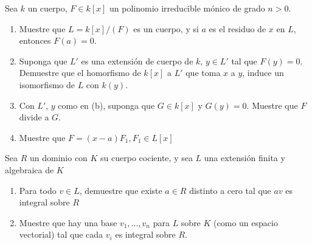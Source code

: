 \begin{prob}{1.51}
    Sea \(k\) un cuerpo, \(F\in k[x]\) un polinomio irreducible mónico de grado \(n>0\).
    \begin{enumerate}[label= (\alph*)]
        \item Muestre que \(L=k[x]/(F)\) es un cuerpo, y si \(a\) es el residuo de \(x\) en \(L\), entonces \(F(a)=0\).
        \item Suponga que \(L'\) es una extensión de cuerpo de \(k\), \(y\in L'\) tal que \(F(y)=0\). Demuestre que el homorfismo de \(k[x]\) a \(L'\) que toma \(x\) a \(y\), induce un isomorfismo de \(L\) con \(k(y)\).
        \item Con \(L'\), \(y\) como en (b), suponga que \(G\in k[x]\) y \(G(y)=0\). Muestre que \(F\) divide a \(G\).
        \item Muestre que \(F=(x-a)F_1,F_1\in L[x]\)
    \end{enumerate}
\end{prob}

\begin{sol}{1.51}

\end{sol}

\begin{prob}{1.54}
    Sea \(R\) un dominio con \(K\) su cuerpo cociente, y sea \(L\) una extensión finita y algebraica de \(K\)
    \begin{enumerate}
        \item Para todo \(v\in L\), demuestre que existe \(a\in R\) distinto a cero tal que \(av\) es integral sobre \(R\)
        \item Muestre que hay una base \(v_1,...,v_n\) para \(L\) sobre \(K\) (como un espacio vectorial) tal que cada \(v_i\) es integral sobre \(R\).
    \end{enumerate}
\end{prob}

\begin{sol}{1.54}

\end{sol}

